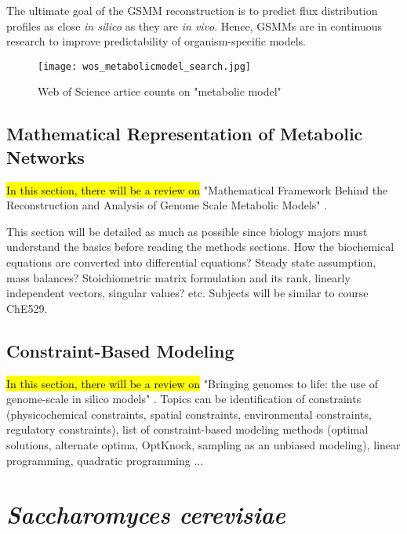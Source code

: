 The ultimate goal of the GSMM reconstruction is to predict flux distribution profiles as close \emph{in silico} as they are \emph{in vivo}. Hence, GSMMs are in continuous research to improve predictability of organism-specific models.

\begin{figure}[ht]
\begin{center}
\texttt{[image: wos\_metabolicmodel\_search.jpg]}
\end{center}
\caption[Web of Science artice counts on "metabolic model"]{Web of Science artice counts on "metabolic model"}
\label{fig:wos_metabolicmodel}
\end{figure}

\subsection{Mathematical Representation of Metabolic Networks}
\hl{In this section, there will be a review on} "Mathematical Framework Behind the Reconstruction and Analysis of Genome Scale Metabolic Models" \cite{pinzon2018mathematical}.

 This section will be detailed as much as possible since biology majors must understand the basics before reading the methods sections. How the biochemical equations are converted into differential equations? Steady state assumption, mass balances? Stoichiometric matrix formulation and its rank, linearly independent vectors, singular values? etc. Subjects will be similar to course ChE529.


\subsection{Constraint-Based Modeling}

\hl{In this section, there will be a review on} "Bringing genomes to life: the use of genome-scale in silico models" \cite{thiele2007bringing}.
Topics can be identification of constraints (physicochemical constraints, spatial constraints, environmental constraints, regulatory constraints), list of constraint-based modeling methods (optimal solutions, alternate optima, OptKnock, sampling as an unbiased modeling), linear programming, quadratic programming ...


\section{\emph{Saccharomyces cerevisiae}}


